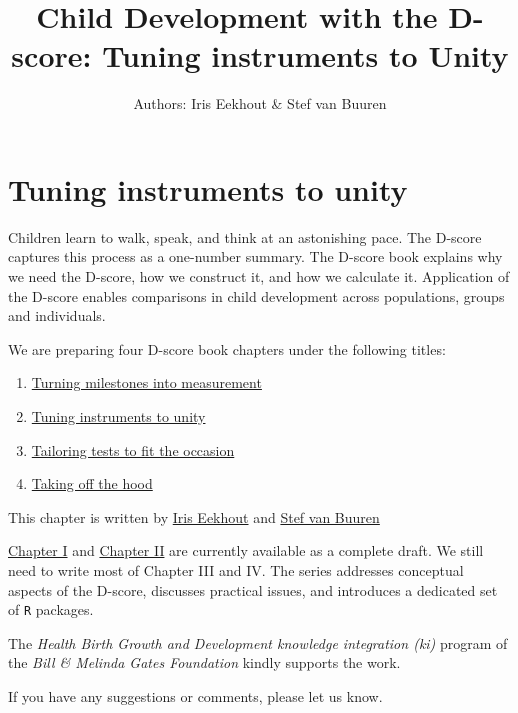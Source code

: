 \documentclass[
]{book}
\title{Child Development with the D-score: Tuning instruments to Unity}
\author{Authors: Iris Eekhout \& Stef van Buuren}
\date{}
\providecommand{\tightlist}{%
  \setlength{\itemsep}{0pt}\setlength{\parskip}{0pt}}
\begin{document}
\maketitle

{
\setcounter{tocdepth}{1}
\tableofcontents
}
\hypertarget{tuning-instruments-to-unity}{%
\chapter*{Tuning instruments to unity}\label{tuning-instruments-to-unity}}

Children learn to walk, speak, and think at an astonishing pace. The D-score captures this process as a one-number summary. The D-score book explains why we need the D-score, how we construct it, and how we calculate it. Application of the D-score enables comparisons in child development across populations, groups and individuals.

We are preparing four D-score book chapters under the following titles:

\begin{enumerate}
\def\labelenumi{\Roman{enumi}.}
\tightlist
\item
  \href{https://d-score.org/dbook1}{Turning milestones into measurement}
\item
  \href{https://d-score.org/dbook2}{Tuning instruments to unity}
\item
  \href{https://stefvanbuuren.name/dbook3}{Tailoring tests to fit the occasion}
\item
  \href{https://stefvanbuuren.name/dbook4}{Taking off the hood}
\end{enumerate}

This chapter is written by \href{https://www.iriseekhout.com}{Iris Eekhout} and \href{https://stefvanbuuren.name}{Stef van Buuren}

\href{https://d-score.org/dbook1}{Chapter I} and \href{https://d-score.org/dbook2}{Chapter II} are currently available as a complete draft. We still need to write most of Chapter III and IV. The series addresses conceptual aspects of the D-score, discusses practical issues, and introduces a dedicated set of \texttt{R} packages.

The \emph{Health Birth Growth and Development knowledge integration (ki)} program of the \emph{Bill \& Melinda Gates Foundation} kindly supports the work.

If you have any suggestions or comments, please let us know.
\end{document}
